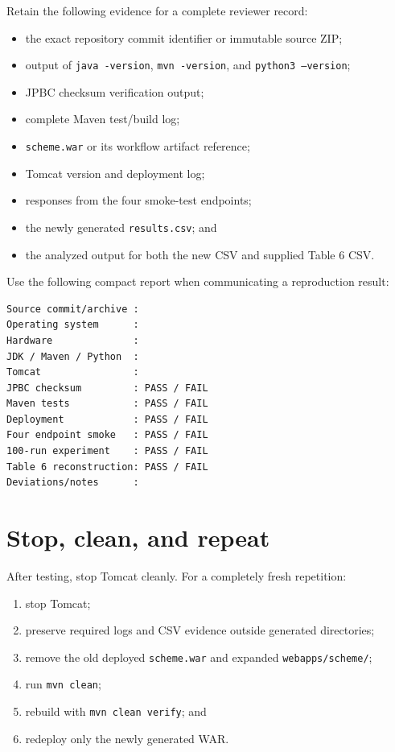 \documentclass[11pt,a4paper]{article}
\begin{document}
Retain the following evidence for a complete reviewer record:

\begin{itemize}
  \item the exact repository commit identifier or immutable source ZIP;
  \item output of \texttt{java -version}, \texttt{mvn -version}, and \texttt{python3 --version};
  \item JPBC checksum verification output;
  \item complete Maven test/build log;
  \item \texttt{scheme.war} or its workflow artifact reference;
  \item Tomcat version and deployment log;
  \item responses from the four smoke-test endpoints;
  \item the newly generated \texttt{results.csv}; and
  \item the analyzed output for both the new CSV and supplied Table 6 CSV.
\end{itemize}

Use the following compact report when communicating a reproduction result:

\begin{lstlisting}[style=terminal]
Source commit/archive :
Operating system      :
Hardware              :
JDK / Maven / Python  :
Tomcat                :
JPBC checksum         : PASS / FAIL
Maven tests           : PASS / FAIL
Deployment            : PASS / FAIL
Four endpoint smoke   : PASS / FAIL
100-run experiment    : PASS / FAIL
Table 6 reconstruction: PASS / FAIL
Deviations/notes      :
\end{lstlisting}

\section{Stop, clean, and repeat}

After testing, stop Tomcat cleanly. For a completely fresh repetition:

\begin{enumerate}
  \item stop Tomcat;
  \item preserve required logs and CSV evidence outside generated directories;
  \item remove the old deployed \texttt{scheme.war} and expanded \texttt{webapps/scheme/};
  \item run \texttt{mvn clean};
  \item rebuild with \texttt{mvn clean verify}; and
  \item redeploy only the newly generated WAR.
\end{enumerate}
\end{document}
